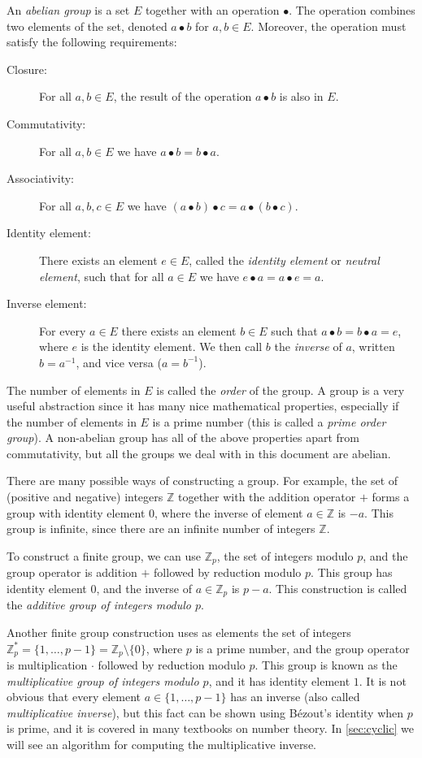 \documentclass[manuscript]{acmart}
\begin{document}
An \emph{abelian group} is a set $E$ together with an operation $\bullet$.
The operation combines two elements of the set, denoted $a \bullet b$ for $a, b \in E$.
Moreover, the operation must satisfy the following requirements:
\begin{description}
\item[Closure:] For all $a, b \in E$, the result of the operation $a \bullet b$ is also in $E$.
\item[Commutativity:] For all $a, b \in E$ we have $a \bullet b = b \bullet a$.
\item[Associativity:] For all $a, b, c \in E$ we have $(a \bullet b) \bullet c = a \bullet (b \bullet c)$.
\item[Identity element:] There exists an element $e \in E$, called the \emph{identity element} or \emph{neutral element}, such that for all $a \in E$ we have $e \bullet a = a \bullet e = a$.
\item[Inverse element:] For every $a \in E$ there exists an element $b \in E$ such that $a \bullet b = b \bullet a = e$, where $e$ is the identity element. We then call $b$ the \emph{inverse} of $a$, written $b = a^{-1}$, and vice versa ($a = b^{-1}$).
\end{description}

The number of elements in $E$ is called the \emph{order} of the group.
A group is a very useful abstraction since it has many nice mathematical properties, especially if the number of elements in $E$ is a prime number (this is called a \emph{prime order group}).
A non-abelian group has all of the above properties apart from commutativity, but all the groups we deal with in this document are abelian.

There are many possible ways of constructing a group.
For example, the set of (positive and negative) integers $\mathbb{Z}$ together with the addition operator $+$ forms a group with identity element $0$, where the inverse of element $a \in \mathbb{Z}$ is $-a$.
This group is infinite, since there are an infinite number of integers $\mathbb{Z}$.

To construct a finite group, we can use $\mathbb{Z}_p$, the set of integers modulo $p$, and the group operator is addition $+$ followed by reduction modulo $p$.
This group has identity element $0$, and the inverse of $a \in \mathbb{Z}_p$ is $p-a$.
This construction is called the \emph{additive group of integers modulo $p$}.

Another finite group construction uses as elements the set of integers $\mathbb{Z}_p^* = \{1,\dots, p-1\} = \mathbb{Z}_p \setminus \{0\}$, where $p$ is a prime number, and the group operator is multiplication $\cdot$ followed by reduction modulo $p$.
This group is known as the \emph{multiplicative group of integers modulo $p$}, and it has identity element $1$.
It is not obvious that every element $a \in \{1,\dots, p-1\}$ has an inverse (also called \emph{multiplicative inverse}), but this fact can be shown using Bézout's identity when $p$ is prime, and it is covered in many textbooks on number theory.
In \autoref{sec:cyclic} we will see an algorithm for computing the multiplicative inverse.
\end{document}
